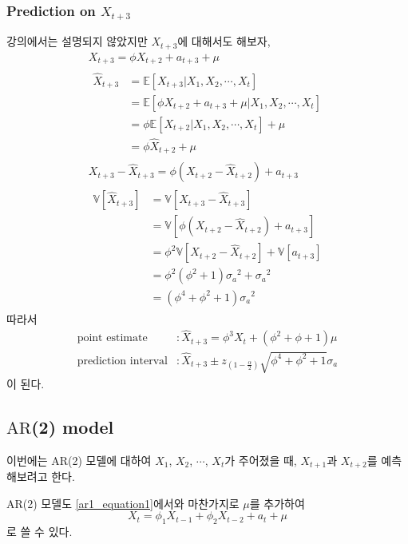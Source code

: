 \documentclass{article}
\newcommand\ar{\ensuremath{\text{AR}}}
\newcommand\sa{\ensuremath{{\sigma_a}}}
\begin{document}
%
\subsubsection{Prediction on \(X_{t+3}\)}
강의에서는 설명되지 않았지만 \(X_{t+3}\)에 대해서도 해보자,
\begin{gather*}
X_{t+3}=\phi X_{t+2}+a_{t+3}+\mu\\
\begin{aligned}
\hat X_{t+3}
&=\mathbb E[X_{t+3}|X_1,X_2,\cdots,X_t]\\
&=\mathbb E[\phi X_{t+2}+a_{t+3}+\mu|X_1,X_2,\cdots,X_t]\\
&=\phi\mathbb E[X_{t+2}|X_1,X_2,\cdots,X_t]+\mu\\
&=\phi\hat X_{t+2}+\mu
\end{aligned}\\
X_{t+3}-\hat X_{t+3}=\phi\left(X_{t+2}-\hat X_{t+2}\right)+a_{t+3}\\
\begin{aligned}
\mathbb V[\hat X_{t+3}]
&=\mathbb V[X_{t+3}-\hat X_{t+3}]\\
&=\mathbb V[\phi\left(X_{t+2}-\hat X_{t+2}\right)+a_{t+3}]\\
&=\phi^2\mathbb V\left[X_{t+2}-\hat X_{t+2}\right]+\mathbb V[a_{t+3}]\\
&=\phi^2(\phi^2+1)\sa^2+\sa^2\\
&=(\phi^4+\phi^2+1)\sa^2
\end{aligned}
\end{gather*}
따라서
\begin{align*}
\text{point estimate}		&:\hat X_{t+3} = \phi^3 X_t+(\phi^2+\phi+1)\mu\\
\text{prediction interval}	&:\hat X_{t+3}\pm z_{(1-\frac\alpha2)}\sqrt{\phi^4+\phi^2+1}\sa
\end{align*}
이 된다.


\subsection{\ar(2) model}
이번에는 \ar(2) 모델에 대하여 \(X_1\), \(X_2\), \(\cdots\), \(X_t\)가 주어졌을 때, \(X_{t+1}\)과 \(X_{t+2}\)를 예측해보려고 한다.

\ar(2) 모델도 \eqref{ar1_equation1}에서와 마찬가지로 \(\mu\)를 추가하여
\begin{equation}\label{ar2_equation1}
X_t=\phi_1X_{t-1}+\phi_2X_{t-2}+a_t+\mu
\end{equation}
로 쓸 수 있다.

%
\end{document}
